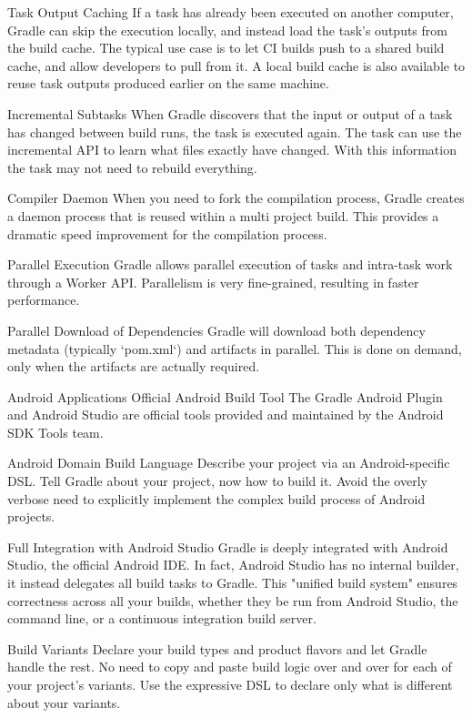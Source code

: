 Task Output Caching
If a task has already been executed on another computer, Gradle can skip the execution locally, and instead load the task's outputs from the build cache. The typical use case is to let CI builds push to a shared build cache, and allow developers to pull from it. A local build cache is also available to reuse task outputs produced earlier on the same machine.

Incremental Subtasks
When Gradle discovers that the input or output of a task has changed between build runs, the task is executed again. The task can use the incremental API to learn what files exactly have changed. With this information the task may not need to rebuild everything.

Compiler Daemon
When you need to fork the compilation process, Gradle creates a daemon process that is reused within a multi project build. This provides a dramatic speed improvement for the compilation process.

Parallel Execution
Gradle allows parallel execution of tasks and intra-task work through a Worker API. Parallelism is very fine-grained, resulting in faster performance.

Parallel Download of Dependencies
Gradle will download both dependency metadata (typically `pom.xml`) and artifacts in parallel. This is done on demand, only when the artifacts are actually required.


Android Applications
Official Android Build Tool
The Gradle Android Plugin and Android Studio are official tools provided and maintained by the Android SDK Tools team.

Android Domain Build Language
Describe your project via an Android-specific DSL. Tell Gradle about your project, now how to build it. Avoid the overly verbose need to explicitly implement the complex build process of Android projects.

Full Integration with Android Studio
Gradle is deeply integrated with Android Studio, the official Android IDE. In fact, Android Studio has no internal builder, it instead delegates all build tasks to Gradle. This "unified build system" ensures correctness across all your builds, whether they be run from Android Studio, the command line, or a continuous integration build server.

Build Variants
Declare your build types and product flavors and let Gradle handle the rest. No need to copy and paste build logic over and over for each of your project's variants. Use the expressive DSL to declare only what is different about your variants.

